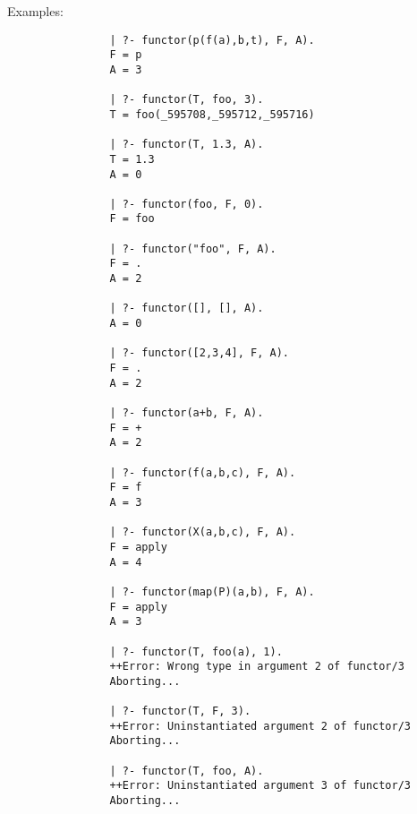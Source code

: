 \begin{description}
    Examples:
    {\footnotesize
     \begin{verbatim}
                | ?- functor(p(f(a),b,t), F, A).
                F = p
                A = 3

                | ?- functor(T, foo, 3).
                T = foo(_595708,_595712,_595716)

                | ?- functor(T, 1.3, A).
                T = 1.3
                A = 0

                | ?- functor(foo, F, 0).
                F = foo

                | ?- functor("foo", F, A).
                F = .
                A = 2

                | ?- functor([], [], A).
                A = 0

                | ?- functor([2,3,4], F, A).
                F = .
                A = 2

                | ?- functor(a+b, F, A).
                F = +
                A = 2

                | ?- functor(f(a,b,c), F, A).
                F = f
                A = 3

                | ?- functor(X(a,b,c), F, A).
                F = apply
                A = 4

                | ?- functor(map(P)(a,b), F, A).
                F = apply
                A = 3

                | ?- functor(T, foo(a), 1).
                ++Error: Wrong type in argument 2 of functor/3
                Aborting...

                | ?- functor(T, F, 3).
                ++Error: Uninstantiated argument 2 of functor/3
                Aborting...

                | ?- functor(T, foo, A).
                ++Error: Uninstantiated argument 3 of functor/3
                Aborting...
     \end{verbatim}}


\end{description}
